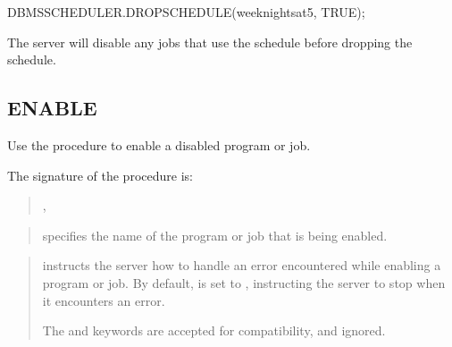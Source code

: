 \documentclass[letterpaper,10pt,english,openany,oneside]{sphinxmanual}
\begin{document}
%
\begin{sphinxVerbatim}[commandchars=\\\{\}]
DBMS\PYGZus{}SCHEDULER.DROP\PYGZus{}SCHEDULE(\PYGZsq{}weeknights\PYGZus{}at\PYGZus{}5\PYGZsq{}, TRUE);
\end{sphinxVerbatim}

The server will disable any jobs that use the schedule before dropping
the schedule.
\label{\detokenize{dbms_scheduler_enable:dbms-scheduler-enable}}
\newpage

\ignorespaces 

\subsection{ENABLE}
\label{\detokenize{dbms_scheduler_enable::doc}}\label{\detokenize{dbms_scheduler_enable:index-0}}\label{\detokenize{dbms_scheduler_enable:enable}}
Use the  procedure to enable a disabled program or job.

The signature of the  procedure is:
\begin{quote}

\begin{DUlineblock}{0em}
\item[] 
\item[] ,
\item[] 
\end{DUlineblock}
\end{quote}


\begin{quote}

 specifies the name of the program or job that is being
enabled.
\end{quote}

\begin{quote}

 instructs the server how to handle an error
encountered while enabling a program or job. By default,
 is set to , instructing
the server to stop when it encounters an error.

The  and  keywords are accepted for
compatibility, and ignored.
\end{quote}
\end{document}
